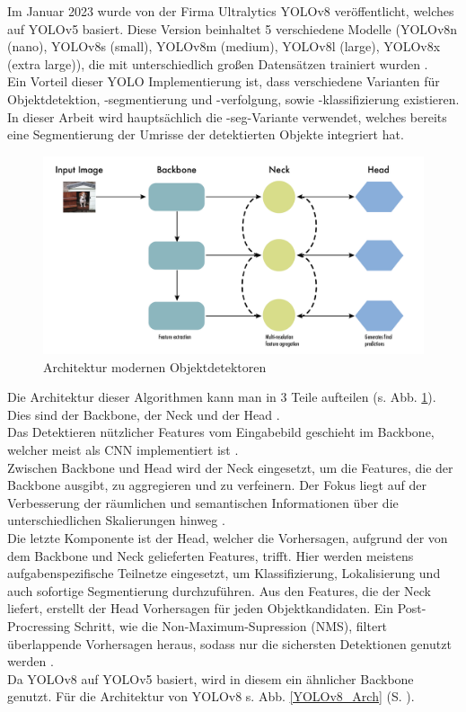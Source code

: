 {{	Im Januar 2023 wurde von der Firma Ultralytics YOLOv8 veröffentlicht, welches auf YOLOv5 basiert. Diese Version beinhaltet 5 verschiedene Modelle (YOLOv8n (nano), YOLOv8s (small), YOLOv8m (medium), YOLOv8l (large), YOLOv8x (extra large)), die mit unterschiedlich großen Datensätzen trainiert wurden  \citep{Terven2023}. \\	
	Ein Vorteil dieser YOLO Implementierung ist, dass verschiedene Varianten für Ob\-jekt\-det\-ekt\-ion, -seg\-men\-tier\-ung und -ver\-fol\-gung, sowie -klas\-si\-fi\-zier\-ung existieren. In dieser Arbeit wird hauptsächlich die \glqq -seg\grqq{}-Variante verwendet, welches bereits eine Segmentierung der Umrisse der detektierten Objekte integriert hat.
	\begin{figure}[h]
		\centering
		\includegraphics*[scale = 0.20, keepaspectratio]{images/YOLO/YOLOv8_object_detector_general.png}
		\caption[Architektur modernen Objektdetektoren]{Architektur modernen Objektdetektoren \citep{Terven2023}}
		\label{YOLO_obj_det_gen}
	\end{figure}
	Die Architektur dieser Algorithmen kann man in 3 Teile aufteilen (s. Abb. \ref{YOLO_obj_det_gen}). Dies sind der Backbone, der Neck und der Head \citep{Terven2023}. \\
	Das Detektieren nützlicher Features vom Eingabebild geschieht im Backbone, welcher meist als CNN implementiert ist \citep{Terven2023}. \\
	Zwischen Backbone und Head wird der Neck eingesetzt, um die Features, die der Backbone ausgibt, zu aggregieren und zu verfeinern. Der Fokus liegt auf der Verbesserung der räumlichen und semantischen Informationen über die unterschiedlichen Skalierungen hinweg \citep{Terven2023}. \\
	Die letzte Komponente ist der Head, welcher die Vorhersagen, aufgrund der von dem Backbone und Neck gelieferten Features, trifft. Hier werden meistens aufgabenspezifische Teilnetze eingesetzt, um Klassifizierung, Lokalisierung und auch sofortige Segmentierung durchzuführen. Aus den Features, die der Neck liefert, erstellt der Head Vorhersagen für jeden Objektkandidaten. Ein Post-Procressing Schritt, wie die Non-Maximum-Supression (NMS), filtert überlappende Vorhersagen heraus, sodass nur die sichersten Detektionen genutzt werden \citep{Terven2023}.\\
	Da YOLOv8 auf YOLOv5 basiert, wird in diesem ein ähnlicher Backbone genutzt. Für die Architektur von YOLOv8 s. Abb. \ref{YOLOv8_Arch} (S. \pageref{YOLOv8_Arch}). 

}}
